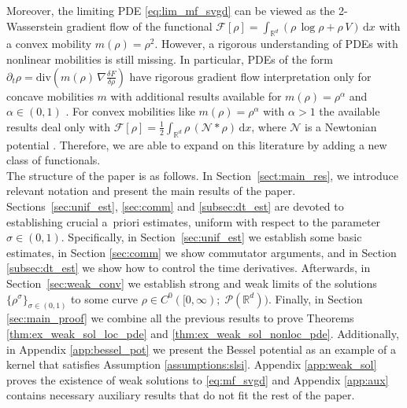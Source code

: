 \documentclass[reqno, 11pt]{amsart}
\numberwithin{equation}{section}
\theoremstyle{definition}
\begin{document}
    Moreover, the limiting PDE \eqref{eq:lim_mf_svgd} can be viewed as the 2-Wasserstein gradient flow of the functional $\mathcal{F}[\rho] = \int_{\mathbb{R}^{d}} (\rho\, \log \rho + \rho\, V) \,\mathrm{d} x$ with a convex mobility $m(\rho) = \rho^2$. However, a rigorous understanding of PDEs with nonlinear mobilities is still missing. In particular, PDEs of the form $\partial_t \rho = \mathrm{div}(m(\rho)\,\nabla \frac{\delta F}{\delta \rho})$ have rigorous gradient flow interpretation only for concave mobilities $m$ \cite{carrillo_lisini_savare_slepcev_2010_nonlinear} with additional results available for $m(\rho) = \rho^{\alpha}$ and $\alpha\in(0,1)$ \cite{decourcel_elbar_2025_repulsion,carrillo_gomezcastro_vazquez_2022_fast}. For convex mobilities like $m(\rho) = \rho^{\alpha}$ with $\alpha>1$ the available results deal only with $\mathcal{F}[\rho] = \frac{1}{2}\int_{\mathbb{R}^{d}} \rho\, (\mathcal{N}\ast \rho) \,\mathrm{d} x$, where $\mathcal{N}$ is a Newtonian potential \cite{decourcel_elbar_2025_repulsion,carrillo_gomezcastro_vazquez_2022_vortex}. Therefore, we are able to expand on this literature by adding a new class of functionals.\\
    
    The structure of the paper is as follows. In Section~\ref{sect:main_res}, we introduce relevant notation and present the main results of the paper. Sections~\ref{sec:unif_est}, \ref{sec:comm} and \ref{subsec:dt_est} are devoted to establishing crucial a~priori estimates, uniform with respect to the parameter $\sigma \in (0,1)$. Specifically, in Section~\ref{sec:unif_est} we establish some basic estimates, in Section \ref{sec:comm} we show commutator arguments, and in Section \ref{subsec:dt_est} we show how to control the time derivatives. Afterwards, in Section~\ref{sec:weak_conv} we establish strong and weak limits of the solutions $\{\rho^\sigma\}_{\sigma\in (0,1)}$ to some curve $\rho\in C^0([0,\infty);\;\mathscr{P}(\mathbb{R}^{d}))$. Finally, in Section \ref{sec:main_proof} we combine all the previous results to prove Theorems \ref{thm:ex_weak_sol_loc_pde} and \ref{thm:ex_weak_sol_nonloc_pde}. Additionally, in Appendix \ref{app:bessel_pot} we present the Bessel potential as an example of a kernel that satisfies Assumption \ref{assumptions:slsi}. Appendix \ref{app:weak_sol} proves the existence of weak solutions to \eqref{eq:mf_svgd} and Appendix \ref{app:aux} contains necessary auxiliary results that do not fit the rest of the paper.

    
\end{document}
